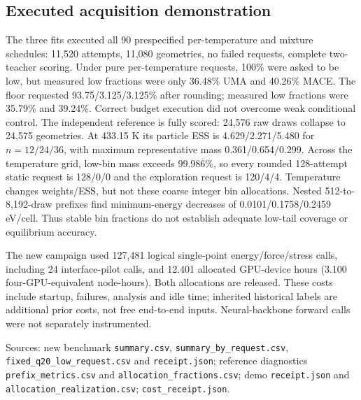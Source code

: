 \subsection{Executed acquisition demonstration}
The three fits executed all 90 prespecified per-temperature and mixture
schedules: 11,520 attempts, 11,080 geometries, no failed requests, complete
two-teacher scoring. Under pure per-temperature requests, 100\% were asked to
be low, but measured low fractions were only 36.48\% UMA and 40.26\% MACE.
The floor requested 93.75/3.125/3.125\% after rounding; measured low fractions
were 35.79\% and 39.24\%. Correct budget execution did not overcome weak
conditional control.
The independent reference is fully scored: 24,576 raw draws collapse to
24,575 geometries. At 433.15 K its particle ESS is 4.629/2.271/5.480 for
$n=12/24/36$, with maximum representative mass 0.361/0.654/0.299.
Across the temperature grid, low-bin mass exceeds 99.986\%, so every rounded
128-attempt static request is 128/0/0 and the exploration request is 120/4/4.
Temperature changes weights/ESS, but not these coarse integer bin allocations.
Nested 512-to-8,192-draw prefixes find minimum-energy decreases of
0.0101/0.1758/0.2459 eV/cell. Thus stable bin fractions do not establish
adequate low-tail coverage or equilibrium accuracy.

The new campaign used 127,481 logical single-point energy/force/stress calls,
including 24 interface-pilot calls, and 12.401 allocated GPU-device hours
(3.100 four-GPU-equivalent node-hours). Both allocations are released. These
costs include startup, failures, analysis and idle time; inherited historical
labels are additional prior costs, not free end-to-end inputs. Neural-backbone
forward calls were not separately instrumented.

{\footnotesize Sources: new benchmark \texttt{summary.csv},
\texttt{summary\_by\_request.csv}, \texttt{fixed\_q20\_low\_request.csv}
and \texttt{receipt.json}; reference diagnostics \texttt{prefix\_metrics.csv}
and \texttt{allocation\_fractions.csv}; demo \texttt{receipt.json} and
\texttt{allocation\_realization.csv}; \texttt{cost\_receipt.json}.}
